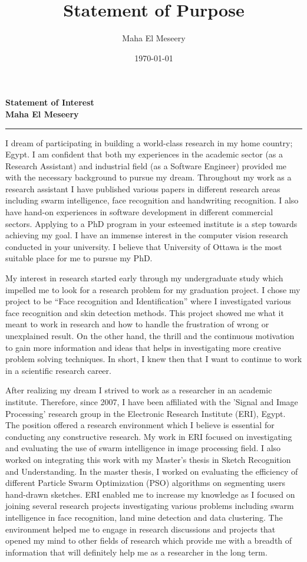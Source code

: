 \documentclass[10pt]{article}%
\title{Statement of Purpose}
\author{Maha El Meseery }
\date{\today}
\begin{document}
\large
 \begin{center}
\textbf{ Statement of  Interest \\ Maha El Meseery } \hrule
\end{center}
\normalsize

I dream of participating in building a world-class research in my home country; Egypt. I am confident that both my experiences in the academic sector (as a Research Assistant) and industrial field (as a Software Engineer) provided me with the necessary background to pursue my dream. Throughout my work as a research assistant I have published various papers in different research areas including swarm intelligence, face recognition and handwriting recognition. I also have hand-on experiences in software development in different commercial sectors. Applying to a PhD program in your esteemed institute is a step towards achieving my goal. I have an immense interest in the computer vision research conducted in your university. I believe that University of Ottawa is the most suitable place for me to pursue my PhD.

 My interest in research started early through my undergraduate study which impelled me to look for a research problem for my graduation project. I chose my project to be ``Face recognition and Identification'' where I investigated various face recognition and skin detection methods. This project showed me what it meant to work in research and how to handle the frustration of wrong or unexplained result. On the other hand, the thrill and the continuous motivation to gain more information and ideas that helps in investigating more creative problem solving techniques. In short, I knew then that I want to continue to work in a scientific research career.


 After realizing my dream I strived to work as a researcher in an academic institute. Therefore, since 2007, I have been affiliated with the 'Signal and Image Processing' research group in the Electronic Research Institute (ERI), Egypt. The position offered a research environment which I believe is essential for conducting any constructive research. My work in ERI focused on investigating and evaluating the use of swarm intelligence in image processing field. I also worked on integrating this work with my Master's thesis in Sketch Recognition and Understanding. In the master thesis, I worked on evaluating the efficiency of different Particle Swarm Optimization (PSO) algorithms on segmenting users hand-drawn sketches. ERI enabled me to increase my knowledge as I focused on joining several research projects investigating various problems including swarm intelligence in face recognition, land mine detection and data clustering. The environment helped me to engage in research discussions and projects that opened my mind to other fields of research which provide me with a breadth of information that will definitely help me as a researcher in the long term.
\end{document}
